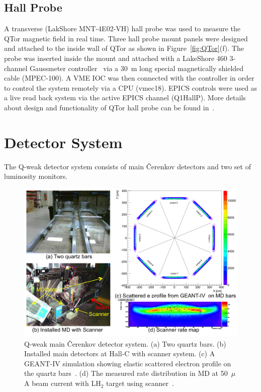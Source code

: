 \subsection{Hall Probe}
\label{Hall Probe}

A transverse (LakShore MNT-4E02-VH) hall probe was used to measure the QTor magnetic field in real time. Three hall probe mount panels were designed and attached to the inside wall of QTor as shown in Figure~\ref{fig:QTor}(f). The probe was inserted inside the mount and attached with a LakeShore 460 3-channel Gaussmeter controller~\cite{manual_hall_probe} via a 30~m long special magnetically shielded cable (MPEC-100). A VME IOC was then connected with the controller in order to control the system remotely via a CPU (vmec18). EPICS controls were used as a live read back system via the active EPICS channel (Q1HallP). More details about design and functionality of QTor hall probe can be found in~\cite{nur_qtor_hallprobe}.


\section{Detector System}%
\label{Detector System}

The Q-weak detector system consists of main \v{C}erenkov detectors and two set of luminosity monitors.  

\begin{singlespace}
\begin{figure}[!h]
	\begin{center}
	\includegraphics[width=15cm]{figures/main_detector}
	\caption
	{Q-weak main \v{C}erenkov detector system. (a) Two quartz bars. (b) Installed main detectors at Hall-C with scanner system. (c) A GEANT-IV simulation showing elastic scattered electron profile on the quartz bars~\cite{elog:peiqing_analysis588}. (d) The measured rate distribution in MD at 50~$\mu$A beam current with LH$_{2}$ target using scanner~\cite{jie_qweak_thesis}. }
	\label{fig:main_detector}
	\end{center}
\end{figure}
\end{singlespace}

